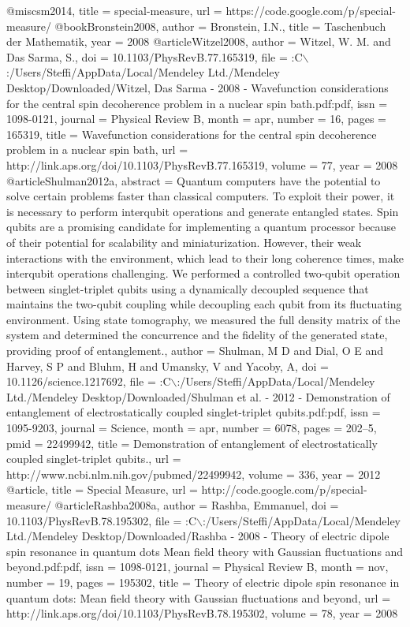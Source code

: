 @misc{sm2014,
title = {special-measure},
url = {https://code.google.com/p/special-measure/}
}
@book{Bronstein2008,
author = {Bronstein, I.N.},
title = {{Taschenbuch der Mathematik}},
year = {2008}
}
@article{Witzel2008,
author = {Witzel, W. M. and {Das Sarma}, S.},
doi = {10.1103/PhysRevB.77.165319},
file = {:C$\backslash$:/Users/Steffi/AppData/Local/Mendeley Ltd./Mendeley Desktop/Downloaded/Witzel, Das Sarma - 2008 - Wavefunction considerations for the central spin decoherence problem in a nuclear spin bath.pdf:pdf},
issn = {1098-0121},
journal = {Physical Review B},
month = {apr},
number = {16},
pages = {165319},
title = {{Wavefunction considerations for the central spin decoherence problem in a nuclear spin bath}},
url = {http://link.aps.org/doi/10.1103/PhysRevB.77.165319},
volume = {77},
year = {2008}
}
@article{Shulman2012a,
abstract = {Quantum computers have the potential to solve certain problems faster than classical computers. To exploit their power, it is necessary to perform interqubit operations and generate entangled states. Spin qubits are a promising candidate for implementing a quantum processor because of their potential for scalability and miniaturization. However, their weak interactions with the environment, which lead to their long coherence times, make interqubit operations challenging. We performed a controlled two-qubit operation between singlet-triplet qubits using a dynamically decoupled sequence that maintains the two-qubit coupling while decoupling each qubit from its fluctuating environment. Using state tomography, we measured the full density matrix of the system and determined the concurrence and the fidelity of the generated state, providing proof of entanglement.},
author = {Shulman, M D and Dial, O E and Harvey, S P and Bluhm, H and Umansky, V and Yacoby, A},
doi = {10.1126/science.1217692},
file = {:C$\backslash$:/Users/Steffi/AppData/Local/Mendeley Ltd./Mendeley Desktop/Downloaded/Shulman et al. - 2012 - Demonstration of entanglement of electrostatically coupled singlet-triplet qubits.pdf:pdf},
issn = {1095-9203},
journal = {Science},
month = {apr},
number = {6078},
pages = {202--5},
pmid = {22499942},
title = {{Demonstration of entanglement of electrostatically coupled singlet-triplet qubits.}},
url = {http://www.ncbi.nlm.nih.gov/pubmed/22499942},
volume = {336},
year = {2012}
}
@article{,
title = {{Special Measure}},
url = {http://code.google.com/p/special-measure/}
}
@article{Rashba2008a,
author = {Rashba, Emmanuel},
doi = {10.1103/PhysRevB.78.195302},
file = {:C$\backslash$:/Users/Steffi/AppData/Local/Mendeley Ltd./Mendeley Desktop/Downloaded/Rashba - 2008 - Theory of electric dipole spin resonance in quantum dots Mean field theory with Gaussian fluctuations and beyond.pdf:pdf},
issn = {1098-0121},
journal = {Physical Review B},
month = {nov},
number = {19},
pages = {195302},
title = {{Theory of electric dipole spin resonance in quantum dots: Mean field theory with Gaussian fluctuations and beyond}},
url = {http://link.aps.org/doi/10.1103/PhysRevB.78.195302},
volume = {78},
year = {2008}
}
